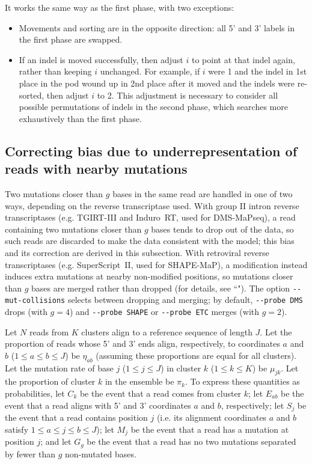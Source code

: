 \documentclass{article}
\begin{document}
\begin{enumerate}
    It works the same way as the first phase, with two exceptions:
    \begin{itemize}
        \item Movements and sorting are in the opposite direction: all 5' and 3' labels in the first phase are swapped.
        \item If an indel is moved successfully, then adjust $i$ to point at that indel again, rather than keeping $i$ unchanged.
        For example, if $i$ were 1 and the indel in 1st place in the pod wound up in 2nd place after it moved and the indels were re-sorted, then adjust $i$ to 2.
        This adjustment is necessary to consider all possible permutations of indels in the second phase, which searches more exhaustively than the first phase.
    \end{itemize}
\end{enumerate}


\subsection{Correcting bias due to underrepresentation of reads with nearby mutations}
\label{bias-correction-algorithm}

Two mutations closer than $g$ bases in the same read are handled in one of two ways, depending on the reverse transcriptase used.
With group II intron reverse transcriptases (e.g. TGIRT-III and Induro~RT, used for DMS-MaPseq), a read containing two mutations closer than $g$ bases tends to drop out of the data, so such reads are discarded to make the data consistent with the model; this bias and its correction are derived in this subsection.
With retroviral reverse transcriptases (e.g. SuperScript~II, used for SHAPE-MaP), a modification instead induces extra mutations at nearby non-modified positions, so mutations closer than $g$ bases are merged rather than dropped (for details, see ``").
The option \verb|--mut-collisions| selects between dropping and merging; by default, \verb|--probe DMS| drops (with $g = 4$) and \verb|--probe SHAPE| or \verb|--probe ETC| merges (with $g = 2$).

Let $N$ reads from $K$ clusters align to a reference sequence of length $J$.
Let the proportion of reads whose 5' and 3' ends align, respectively, to coordinates $a$ and $b$ ($1 \le a \le b \le J$) be $\eta_{ab}$ (assuming these proportions are equal for all clusters). Let the mutation rate of base $j$ ($1 \le j \le J$) in cluster $k$ ($1 \le k \le K$) be $\mu_{jk}$.
Let the proportion of cluster $k$ in the ensemble be $\pi_k$.
To express these quantities as probabilities, let $C_k$ be the event that a read comes from cluster $k$; let $E_{ab}$ be the event that a read aligns with 5' and 3' coordinates $a$ and $b$, respectively; let $S_j$ be the event that a read contains position $j$ (i.e. its alignment coordinates $a$ and $b$ satisfy $1 \le a \le j \le b \le J$); let $M_j$ be the event that a read has a mutation at position $j$; and let $G_g$ be the event that a read has no two mutations separated by fewer than $g$ non-mutated bases.
\end{document}
